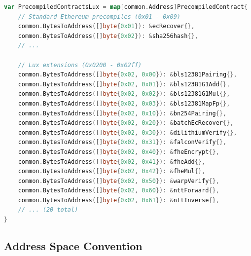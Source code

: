 \begin{lstlisting}[language=Go,caption={Registering a precompile}]
var PrecompiledContractsLux = map[common.Address]PrecompiledContract{
    // Standard Ethereum precompiles (0x01 - 0x09)
    common.BytesToAddress([]byte{0x01}): &ecRecover{},
    common.BytesToAddress([]byte{0x02}): &sha256hash{},
    // ...

    // Lux extensions (0x0200 - 0x02ff)
    common.BytesToAddress([]byte{0x02, 0x00}): &bls12381Pairing{},
    common.BytesToAddress([]byte{0x02, 0x01}): &bls12381G1Add{},
    common.BytesToAddress([]byte{0x02, 0x02}): &bls12381G1Mul{},
    common.BytesToAddress([]byte{0x02, 0x03}): &bls12381MapFp{},
    common.BytesToAddress([]byte{0x02, 0x10}): &bn254Pairing{},
    common.BytesToAddress([]byte{0x02, 0x20}): &batchEcRecover{},
    common.BytesToAddress([]byte{0x02, 0x30}): &dilithiumVerify{},
    common.BytesToAddress([]byte{0x02, 0x31}): &falconVerify{},
    common.BytesToAddress([]byte{0x02, 0x40}): &fheEncrypt{},
    common.BytesToAddress([]byte{0x02, 0x41}): &fheAdd{},
    common.BytesToAddress([]byte{0x02, 0x42}): &fheMul{},
    common.BytesToAddress([]byte{0x02, 0x50}): &warpVerify{},
    common.BytesToAddress([]byte{0x02, 0x60}): &nttForward{},
    common.BytesToAddress([]byte{0x02, 0x61}): &nttInverse{},
    // ... (20 total)
}
\end{lstlisting}

\subsection{Address Space Convention}

